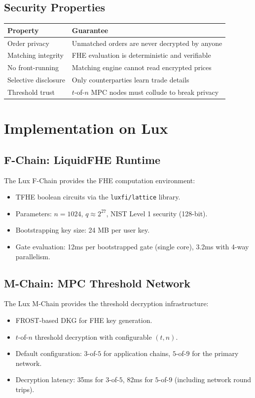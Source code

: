 \documentclass[11pt,a4paper]{article}
\begin{document}
\subsection{Security Properties}

\begin{center}
\begin{tabular}{ll}
\toprule
\textbf{Property} & \textbf{Guarantee} \\
\midrule
Order privacy & Unmatched orders are never decrypted by anyone \\
Matching integrity & FHE evaluation is deterministic and verifiable \\
No front-running & Matching engine cannot read encrypted prices \\
Selective disclosure & Only counterparties learn trade details \\
Threshold trust & $t$-of-$n$ MPC nodes must collude to break privacy \\
\bottomrule
\end{tabular}
\end{center}

\section{Implementation on Lux}

\subsection{F-Chain: LiquidFHE Runtime}

The Lux F-Chain provides the FHE computation environment:
\begin{itemize}[leftmargin=2em]
\item TFHE boolean circuits via the \texttt{luxfi/lattice} library.
\item Parameters: $n = 1024$, $q \approx 2^{27}$, NIST Level 1 security (128-bit).
\item Bootstrapping key size: 24 MB per user key.
\item Gate evaluation: 12ms per bootstrapped gate (single core), 3.2ms with 4-way parallelism.
\end{itemize}

\subsection{M-Chain: MPC Threshold Network}

The Lux M-Chain provides the threshold decryption infrastructure:
\begin{itemize}[leftmargin=2em]
\item FROST-based DKG for FHE key generation.
\item $t$-of-$n$ threshold decryption with configurable $(t, n)$.
\item Default configuration: $3$-of-$5$ for application chains, $5$-of-$9$ for the primary network.
\item Decryption latency: 35ms for $3$-of-$5$, 82ms for $5$-of-$9$ (including network round trips).
\end{itemize}
\end{document}

